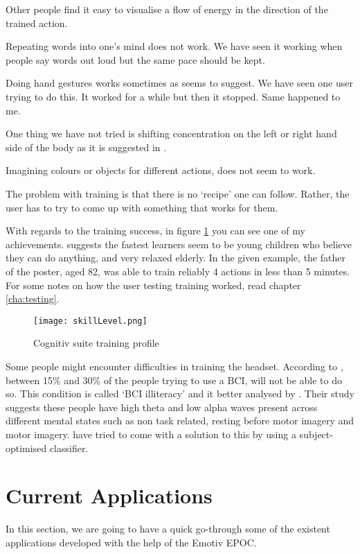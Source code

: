 Other people find it easy to visualise a flow of energy in the direction of the trained action. 

Repeating words into one's mind does not work. We have seen it working when people say words out loud but the same pace should be kept.

Doing hand gestures works sometimes as \cite{emoTraining} seems to suggest. We have seen one user trying to do this. It worked for a while but then it stopped. Same happened to me.

One thing we have not tried is shifting concentration on the left or right hand side of the body as it is suggested in \cite{emoTraining}.

Imagining colours or objects for different actions, does not seem to work.

The problem with training is that there is no `recipe' one can follow. Rather, the user has to try to come up with something that works for them. 

With regards to the training success, in figure \ref{fig:skillLevelMe} you can see one of my achievements. \cite{emoTraining} suggests the fastest learners seem to be young children who believe they can do anything, and very relaxed elderly. In the given example, the father of the poster, aged 82, was able to train reliably 4 actions in less than 5 minutes. For some notes on how the user testing training worked, read chapter \ref{cha:testing}.

\begin{figure}
  \centering
  \texttt{[image: skillLevel.png]}
  \caption{Cognitiv suite training profile}
    \label{fig:skillLevelMe}          
\end{figure}

Some people might encounter difficulties in training the headset. According to \cite{cureBCIilliteracy}, between 15\% and 30\% of the people trying to use a BCI, will not be able to do so. This condition is called `BCI illiteracy' and it better analysed by \cite{BCIilliteracy}. Their study suggests these people have high theta and low alpha waves present across different mental states such as non task related, resting before motor imagery and motor imagery. \cite{cureBCIilliteracy} have tried to come with a solution to this by using a subject-optimised classifier.

\section{Current Applications}
In this section, we are going to have a quick go-through some of the existent applications developed with the help of the Emotiv EPOC.

